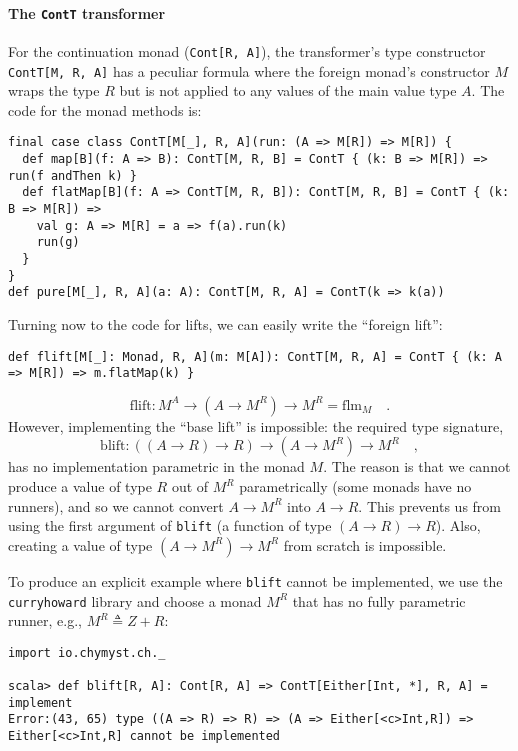 \paragraph{The \texttt{ContT} transformer}

For the continuation monad (\lstinline!Cont[R, A]!), the transformer\textsf{'}s
type constructor \lstinline!ContT[M, R, A]! has a peculiar formula
where the foreign monad\textsf{'}s constructor $M$ wraps the type $R$ but
is not applied to any values of the main value type $A$. The code
for the monad methods is:
\begin{lstlisting}
final case class ContT[M[_], R, A](run: (A => M[R]) => M[R]) {
  def map[B](f: A => B): ContT[M, R, B] = ContT { (k: B => M[R]) => run(f andThen k) }
  def flatMap[B](f: A => ContT[M, R, B]): ContT[M, R, B] = ContT { (k: B => M[R]) =>
    val g: A => M[R] = a => f(a).run(k)
    run(g) 
  }
}
def pure[M[_], R, A](a: A): ContT[M, R, A] = ContT(k => k(a))
\end{lstlisting}

Turning now to the code for lifts, we can easily write the \textsf{``}foreign
lift\textsf{''}:
\begin{lstlisting}
def flift[M[_]: Monad, R, A](m: M[A]): ContT[M, R, A] = ContT { (k: A => M[R]) => m.flatMap(k) }
\end{lstlisting}
\[
\text{flift}:M^{A}\rightarrow(A\rightarrow M^{R})\rightarrow M^{R}=\text{flm}_{M}\quad.
\]
However, implementing the \textsf{``}base lift\textsf{''} is impossible: the required
type signature,
\[
\text{blift}:(\left(A\rightarrow R\right)\rightarrow R)\rightarrow(A\rightarrow M^{R})\rightarrow M^{R}\quad,
\]
has no implementation parametric in the monad $M$. The reason is
that we cannot produce a value of type $R$ out of $M^{R}$ parametrically
(some monads have no runners), and so we cannot convert $A\rightarrow M^{R}$
into $A\rightarrow R$. This prevents us from using the first argument
of \lstinline!blift! (a function of type $(A\rightarrow R)\rightarrow R$).
Also, creating a value of type $(A\rightarrow M^{R})\rightarrow M^{R}$
from scratch is impossible. 

To produce an explicit example where \lstinline!blift! cannot be
implemented, we use the \lstinline!curryhoward! library
and choose a monad $M^{R}$ that has no fully parametric runner, e.g.,
$M^{R}\triangleq Z+R$:
\begin{lstlisting}
import io.chymyst.ch._

scala> def blift[R, A]: Cont[R, A] => ContT[Either[Int, *], R, A] = implement
Error:(43, 65) type ((A => R) => R) => (A => Either[<c>Int,R]) => Either[<c>Int,R] cannot be implemented
\end{lstlisting}


